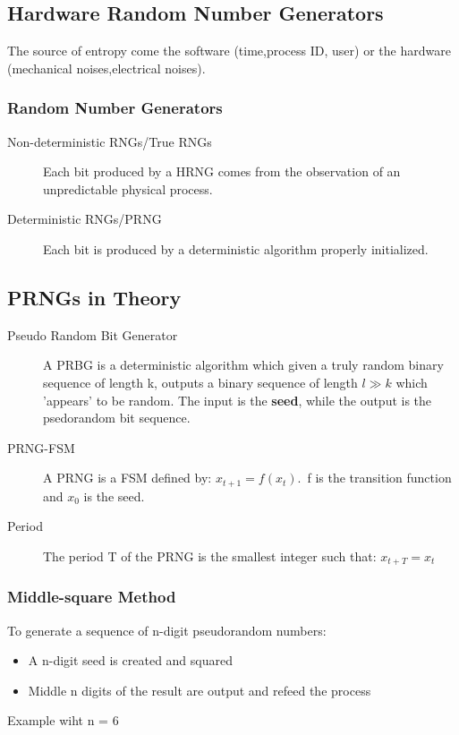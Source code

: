 \subsection{Hardware Random Number Generators}
The source of entropy come the software (time,process ID, user) or the hardware
(mechanical noises,electrical noises).

\subsubsection{Random Number Generators}
\begin{description}
    \item[Non-deterministic RNGs/True RNGs] Each bit produced by a HRNG comes
    from the observation of an unpredictable physical process.
    \item[Deterministic RNGs/PRNG] Each bit is produced by a deterministic
    algorithm properly initialized.
\end{description}

\subsection{PRNGs in Theory}
\begin{description}
    \item[Pseudo Random Bit Generator] A PRBG is a deterministic algorithm
    which given a truly random binary sequence of length k, outputs a binary
    sequence of length $l \gg k $ which 'appears' to be random. The input is
    the \textbf{seed}, while the output is the psedorandom bit sequence.
    \item[PRNG-FSM] A PRNG is a FSM defined by: $x_{t+1} = f(x_t)$.\ f is the
    transition function and $x_0$ is the seed.
    \item[Period] The period T of the PRNG is the smallest integer such that:
    $x_{t+T} = x_t$
\end{description}

\subsubsection{Middle-square Method}
To generate a sequence of n-digit pseudorandom numbers:
\begin{itemize}
    \item A n-digit seed is created and squared
    \item Middle n digits of the result are output and refeed the process
\end{itemize}
Example wiht n = 6

